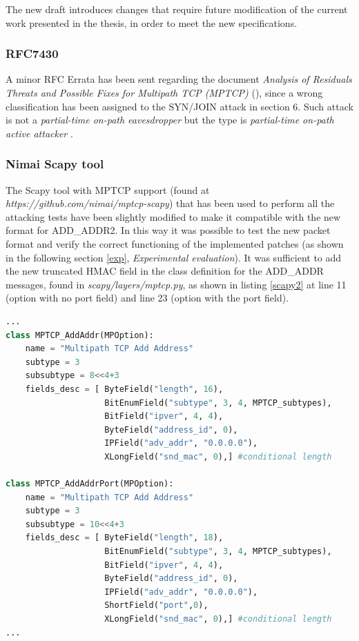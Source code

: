 The new draft introduces changes that require future modification of the current work presented in the thesis, in order to meet the new specifications.

\subsubsection{RFC7430}
A minor RFC Errata has been sent regarding the document \textit{Analysis of Residuals Threats and Possible Fixes for Multipath TCP (MPTCP)} (), since a wrong classification has been assigned to the SYN/JOIN attack in section 6. Such attack is not a \textit{partial-time on-path eavesdropper} but the type is \textit{partial-time on-path active attacker} \cite{errata}.

\subsubsection{Nimai Scapy tool}
The Scapy tool with MPTCP support (found at \textit{https://github.com/nimai/mptcp-scapy}) that has been used to perform all the attacking tests have been slightly modified to make it compatible with the new format for ADD\_ADDR2. In this way it was possible to test the new packet format and verify the correct functioning of the implemented patches (as shown in the following section \ref{exp}, \textit{Experimental evaluation}). It was sufficient to add the new truncated HMAC field in the class definition for the ADD\_ADDR messages, found in \textit{scapy/layers/mptcp.py}, as shown in listing \ref{scapy2} at line 11 (option with no port field) and line 23 (option with the port field).

\begin{lstlisting}[language=Python, caption=\textit{Scapy ADD\_ADDR2 class definition}, label=scapy2]
...
class MPTCP_AddAddr(MPOption):
    name = "Multipath TCP Add Address"
    subtype = 3
    subsubtype = 8<<4+3
    fields_desc = [ ByteField("length", 16),
                    BitEnumField("subtype", 3, 4, MPTCP_subtypes),
                    BitField("ipver", 4, 4),
                    ByteField("address_id", 0),
                    IPField("adv_addr", "0.0.0.0"),
                    XLongField("snd_mac", 0),] #conditional length

class MPTCP_AddAddrPort(MPOption):
    name = "Multipath TCP Add Address"
    subtype = 3
    subsubtype = 10<<4+3
    fields_desc = [ ByteField("length", 18),
                    BitEnumField("subtype", 3, 4, MPTCP_subtypes),
                    BitField("ipver", 4, 4),
                    ByteField("address_id", 0),
                    IPField("adv_addr", "0.0.0.0"),
                    ShortField("port",0),
                    XLongField("snd_mac", 0),] #conditional length
...
\end{lstlisting}

